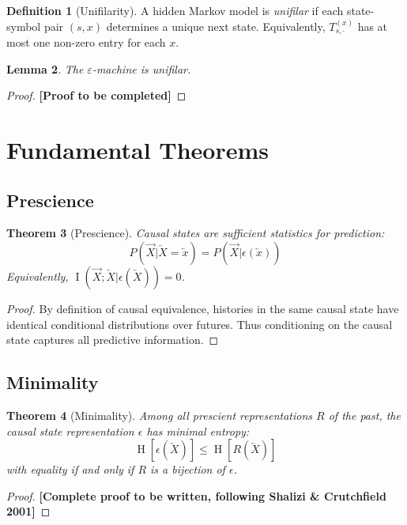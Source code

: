 \documentclass[11pt,twocolumn]{article}
\theoremstyle{plain}
\newtheorem{theorem}{Theorem}[section]
\newtheorem{lemma}[theorem]{Lemma}
\theoremstyle{definition}
\newtheorem{definition}[theorem]{Definition}
\theoremstyle{remark}
\newcommand{\eps}{\varepsilon}
\newcommand{\Past}{\overleftarrow{X}}
\newcommand{\Future}{\overrightarrow{X}}
\newcommand{\past}{\overleftarrow{x}}
\DeclareMathOperator{\Ent}{H}
\DeclareMathOperator{\MI}{I}
\begin{document}
\begin{definition}[Unifilarity]
A hidden Markov model is \emph{unifilar} if each state-symbol pair $(s, x)$ determines a unique next state. Equivalently, $T^{(x)}_{s,\cdot}$ has at most one non-zero entry for each $x$.
\end{definition}

\begin{lemma}
The $\eps$-machine is unifilar.
\end{lemma}
\begin{proof}
\textbf{[Proof to be completed]}
\end{proof}

\section{Fundamental Theorems}
\label{sec:theorems}

\subsection{Prescience}

\begin{theorem}[Prescience]
\label{thm:prescience}
Causal states are sufficient statistics for prediction:
\begin{equation}
    P(\Future | \Past = \past) = P(\Future | \epsilon(\past))
\end{equation}
Equivalently, $\MI(\Future; \Past | \epsilon(\Past)) = 0$.
\end{theorem}
\begin{proof}
By definition of causal equivalence, histories in the same causal state have identical conditional distributions over futures. Thus conditioning on the causal state captures all predictive information.
\end{proof}

\subsection{Minimality}

\begin{theorem}[Minimality]
\label{thm:minimality}
Among all prescient representations $R$ of the past, the causal state representation $\epsilon$ has minimal entropy:
\begin{equation}
    \Ent[\epsilon(\Past)] \leq \Ent[R(\Past)]
\end{equation}
with equality if and only if $R$ is a bijection of $\epsilon$.
\end{theorem}
\begin{proof}
\textbf{[Complete proof to be written, following Shalizi \& Crutchfield 2001]}
\end{proof}
\end{document}
